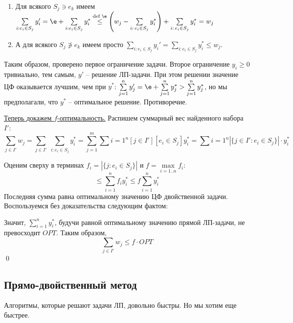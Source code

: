 \begin{enumerate}
\item Для всякого $S_j \ni e_k$ имеем $\sum\limits_{i: e_i \in S_j} y_i' = \e + \sum\limits_{i: e_i \in S_j} y_i^* \overset{\text{def }\e}{\leq} \left(w_j - \sum\limits_{i:\, e_i \in S_j}y_i^*\right) + \sum\limits_{i:\, e_i \in S_j}y_i^* = w_j$

\item А для всякого $S_j \not\ni e_k$ имеем просто $\sum\limits_{i: e_i \in S_j} y_i' = \sum\limits_{i: e_i \in S_j} y_i^* \leq w_j$.
\end{enumerate}

Таким образом, проверено первое ограничение задачи. Второе ограничение $y_i \geq 0$ тривиально, тем самым, $y'$ -- решение ЛП-задачи. При этом решении значение ЦФ оказывается лучшим, чем при $y^*$: $\sum\limits_{j=1}^ny_j' = \e + \sum\limits_{j=1}^n y_j^* > \sum\limits_{j=1}^n y_j^*$, но мы предполагали, что $y^*$ -- оптимальное решение. Противоречие.

\underline{Теперь докажем $f$-оптимальность.}
Распишем суммарный вес найденного набора $I'$:
$$\sum_{j\in I'} w_j = \sum_{j\in I'} \; \sum_{i: e_i \in S_j} y_i^* = \sum_{j=1}^m\sum{i=1}^n [j \in I'] [e_i \in S_j] y_i^* = \sum{i=1}^n|\{j \in I': e_i \in S_j\}|\cdot y_i^*$$

Оценим сверху в терминах $f_i = |\{j: e_i \in S_j\}|$ и $f = \max\limits_{i=1..n} f_i$:
$$ \leq \sum_{i=1}^nf_iy_i^* \leq f\sum_{i=1}^n y_i^*$$
Последняя сумма равна оптимальному значению ЦФ двойственной задачи. Воспользуемся без доказательства следующим фактом:


Значит, $\sum\limits_{i=1}^n y_i^*$, будучи равной оптимальному значению прямой ЛП-задачи, не превосходит $OPT$. Таким образом, $$\sum_{j\in I'} w_j \leq f\cdot OPT$$\qed

\subsection{Прямо-двойственный метод}

Алгоритмы, которые решают задачи ЛП, довольно быстры. Но мы хотим еще быстрее.


